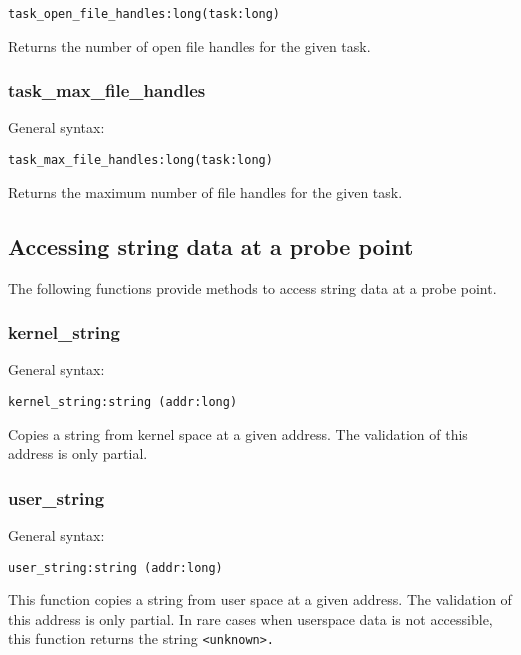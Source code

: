 \documentclass[twoside,english]{article}
\newenvironment{vindent}
{\begin{list}{}{\setlength{\listparindent}{6pt}}
\item[]}
{\end{list}}
\begin{document}
\begin{vindent}
\begin{verbatim}
task_open_file_handles:long(task:long)
\end{verbatim}
\end{vindent}
Returns the number of open file handles for the given task.


\subsubsection{task\_max\_file\_handles}
General syntax:

\begin{vindent}
\begin{verbatim}
task_max_file_handles:long(task:long)
\end{verbatim}
\end{vindent}
Returns the maximum number of file handles for the given task.


\subsection{Accessing string data at a probe point}

The following functions provide methods to access string data at a probe
point.


\subsubsection{kernel\_string}
General syntax:

\begin{vindent}
\begin{verbatim}
kernel_string:string (addr:long)
\end{verbatim}
\end{vindent}
Copies a string from kernel space at a given address. The validation of this
address is only partial.


\subsubsection{user\_string\label{sub:user_string}}
General syntax:

\begin{vindent}
\begin{verbatim}
user_string:string (addr:long)
\end{verbatim}
\end{vindent}
This function copies a string from user space at a given address. The validation
of this address is only partial. In rare cases when userspace data is not
accessible, this function returns the string \texttt{<unknown>.}
\end{document}
